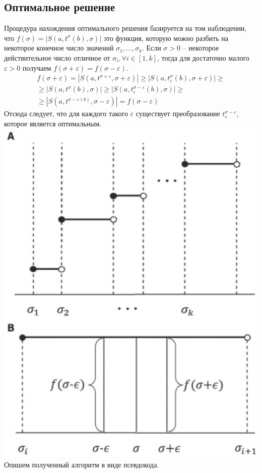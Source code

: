 \documentclass[a4papper]{article}
\newcommand{\eps}{\varepsilon}
\begin{document}
\subsection{Оптимальное решение}
Процедура нахождения оптимального решения базируется на том наблюдении, что $f(\sigma) = |S(a, t^\sigma (b), \sigma)|$ это функция, которую можно разбить на некоторое конечное число значений $\sigma_1, \dots, \sigma_k$. Если $\sigma > 0$ -- некоторое действительное число отличное от $\sigma_i, \forall i \in [1, k]$, тогда для достаточно малого $\eps > 0$ получаем $f(\sigma + \eps) = f(\sigma - \eps)$.	
\begin{gather*}
f(\sigma + \eps) = |S(a, t^{\sigma + \eps}, \sigma + \eps)| \geq |S(a, t_\eps^\sigma (b), \sigma + \eps)| \geq\\ \geq
|S(a, t^\sigma (b), \sigma)| \geq |S(a, t^{\sigma - \eps}_\eps (b), \sigma)| \geq \\ \geq
|S(a, t^{\sigma - \eps (b)}, \sigma - \eps)| = f(\sigma - \eps)
\end{gather*}
Отсюда следует, что для каждого такого $\eps$ существует преобразование $t_\eps^{\sigma - \eps}$, которое является оптимальным.\\
\includegraphics[scale=0.35]{../pictures/btp530f2.jpeg}\\
Опишем полученный алгоритм в виде псевдокода.
\end{document}
